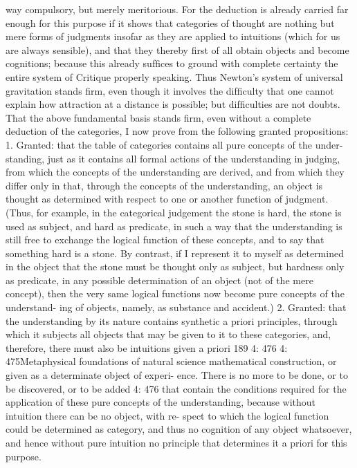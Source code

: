 way compulsory, but merely meritorious. For the deduction is already carried far
enough for this purpose if it shows that categories of thought are nothing but
mere forms of judgments insofar as they are applied to intuitions (which for us
are always sensible), and that they thereby ﬁrst of all obtain objects and become
cognitions; because this already sufﬁces to ground with complete certainty the
entire system of Critique properly speaking. Thus Newton’s system of universal
gravitation stands ﬁrm, even though it involves the difﬁculty that one cannot
explain how attraction at a distance is possible; but difﬁculties are not doubts. That
the above fundamental basis stands ﬁrm, even without a complete deduction
of the categories, I now prove from the following granted propositions:
1. Granted: that the table of categories contains all pure concepts of the under-
standing, just as it contains all formal actions of the understanding in judging,
from which the concepts of the understanding are derived, and from which
they differ only in that, through the concepts of the understanding, an object
is thought as determined with respect to one or another function of judgment.
(Thus, for example, in the categorical judgement the stone is hard, the stone is
used as subject, and hard as predicate, in such a way that the understanding
is still free to exchange the logical function of these concepts, and to say that
something hard is a stone. By contrast, if I represent it to myself as determined
in the object that the stone must be thought only as subject, but hardness only as
predicate, in any possible determination of an object (not of the mere concept),
then the very same logical functions now become pure concepts of the understand-
ing of objects, namely, as substance and accident.)
2. Granted: that the understanding by its nature contains synthetic a priori
principles, through which it subjects all objects that may be given to it to
these categories, and, therefore, there must also be intuitions given a priori
189
4: 476
4: 475Metaphysical foundations of natural science
mathematical construction, or given as a determinate object of experi-
ence. There is no more to be done, or to be discovered, or to be added
4: 476
that contain the conditions required for the application of these pure concepts
of the understanding, because without intuition there can be no object, with re-
spect to which the logical function could be determined as category, and thus
no cognition of any object whatsoever, and hence without pure intuition no
principle that determines it a priori for this purpose.
